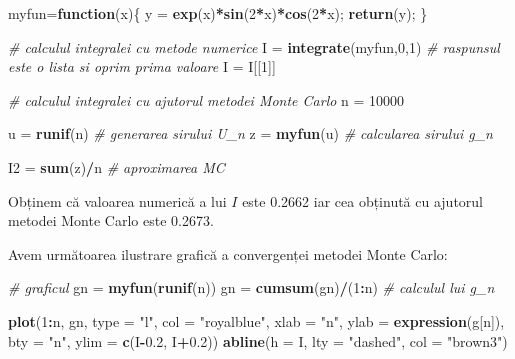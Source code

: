 \documentclass[]{article}
\newenvironment{Shaded}{\begin{snugshade}}{\end{snugshade}}
\newcommand{\KeywordTok}[1]{\textcolor[rgb]{0.13,0.29,0.53}{\textbf{#1}}}
\newcommand{\DataTypeTok}[1]{\textcolor[rgb]{0.13,0.29,0.53}{#1}}
\newcommand{\DecValTok}[1]{\textcolor[rgb]{0.00,0.00,0.81}{#1}}
\newcommand{\FloatTok}[1]{\textcolor[rgb]{0.00,0.00,0.81}{#1}}
\newcommand{\StringTok}[1]{\textcolor[rgb]{0.31,0.60,0.02}{#1}}
\newcommand{\CommentTok}[1]{\textcolor[rgb]{0.56,0.35,0.01}{\textit{#1}}}
\newcommand{\ControlFlowTok}[1]{\textcolor[rgb]{0.13,0.29,0.53}{\textbf{#1}}}
\newcommand{\OperatorTok}[1]{\textcolor[rgb]{0.81,0.36,0.00}{\textbf{#1}}}
\newcommand{\NormalTok}[1]{#1}
\begin{document}
\begin{Shaded}
\begin{Highlighting}[]
\NormalTok{myfun=}\ControlFlowTok{function}\NormalTok{(x)\{}
\NormalTok{  y =}\StringTok{ }\KeywordTok{exp}\NormalTok{(x)}\OperatorTok{*}\KeywordTok{sin}\NormalTok{(}\DecValTok{2}\OperatorTok{*}\NormalTok{x)}\OperatorTok{*}\KeywordTok{cos}\NormalTok{(}\DecValTok{2}\OperatorTok{*}\NormalTok{x);}
  \KeywordTok{return}\NormalTok{(y);}
\NormalTok{\}}

\CommentTok{# calculul integralei cu metode numerice}
\NormalTok{I =}\StringTok{ }\KeywordTok{integrate}\NormalTok{(myfun,}\DecValTok{0}\NormalTok{,}\DecValTok{1}\NormalTok{) }\CommentTok{# raspunsul este o lista si oprim prima valoare}
\NormalTok{I =}\StringTok{ }\NormalTok{I[[}\DecValTok{1}\NormalTok{]]}

\CommentTok{# calculul integralei cu ajutorul metodei Monte Carlo}
\NormalTok{n =}\StringTok{ }\DecValTok{10000} 

\NormalTok{u =}\StringTok{ }\KeywordTok{runif}\NormalTok{(n) }\CommentTok{# generarea sirului U_n}
\NormalTok{z =}\StringTok{ }\KeywordTok{myfun}\NormalTok{(u) }\CommentTok{# calcularea sirului g_n}

\NormalTok{I2 =}\StringTok{ }\KeywordTok{sum}\NormalTok{(z)}\OperatorTok{/}\NormalTok{n }\CommentTok{# aproximarea MC}
\end{Highlighting}
\end{Shaded}

Obținem că valoarea numerică a lui \(I\) este 0.2662 iar cea obținută cu
ajutorul metodei Monte Carlo este 0.2673.

Avem următoarea ilustrare grafică a convergenței metodei Monte Carlo:

\begin{Shaded}
\begin{Highlighting}[]
\CommentTok{# graficul}
\NormalTok{gn =}\StringTok{ }\KeywordTok{myfun}\NormalTok{(}\KeywordTok{runif}\NormalTok{(n)) }
\NormalTok{gn =}\StringTok{ }\KeywordTok{cumsum}\NormalTok{(gn)}\OperatorTok{/}\NormalTok{(}\DecValTok{1}\OperatorTok{:}\NormalTok{n) }\CommentTok{# calculul lui g_n}

\KeywordTok{plot}\NormalTok{(}\DecValTok{1}\OperatorTok{:}\NormalTok{n, gn, }\DataTypeTok{type =} \StringTok{"l"}\NormalTok{, }
     \DataTypeTok{col =} \StringTok{"royalblue"}\NormalTok{, }\DataTypeTok{xlab =} \StringTok{"n"}\NormalTok{, }
     \DataTypeTok{ylab =} \KeywordTok{expression}\NormalTok{(g[n]),}
     \DataTypeTok{bty =} \StringTok{"n"}\NormalTok{,}
     \DataTypeTok{ylim =} \KeywordTok{c}\NormalTok{(I}\OperatorTok{-}\FloatTok{0.2}\NormalTok{, I}\OperatorTok{+}\FloatTok{0.2}\NormalTok{))}
\KeywordTok{abline}\NormalTok{(}\DataTypeTok{h =}\NormalTok{ I, }\DataTypeTok{lty =} \StringTok{"dashed"}\NormalTok{, }\DataTypeTok{col =} \StringTok{"brown3"}\NormalTok{)}
\end{Highlighting}
\end{Shaded}
\end{document}
